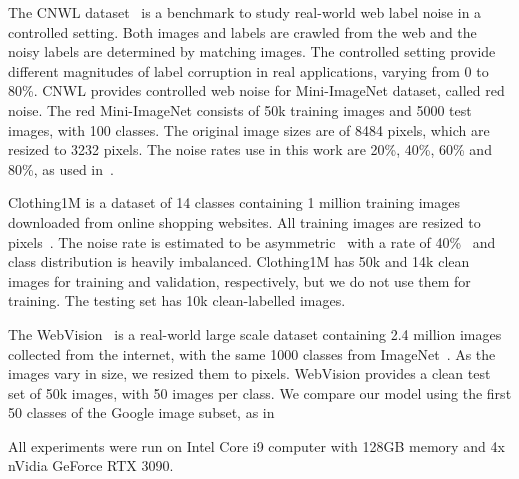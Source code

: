 \documentclass[review]{elsarticle}
\theoremstyle{plain}
\begin{document}
The CNWL dataset~\citep{jiang2020beyond} is a benchmark to study real-world web label noise in a controlled setting. Both images and labels are crawled from the web and the noisy labels are determined by matching images. The controlled setting provide different magnitudes of label corruption in real applications, varying from 0 to 80\%. CNWL provides controlled web noise for Mini-ImageNet dataset, called red noise. The red Mini-ImageNet consists of 50k training images and 5000 test images, with 100 classes. The original image sizes are of 8484 pixels, which are resized to 3232 pixels. The noise rates use in this work are 20\%, 40\%, 60\% and 80\%, as used in~\citep{FaMUS}.   

Clothing1M is a dataset of 14 classes containing 1 million training images downloaded from online shopping websites.
All training images are resized to  pixels~\citep{li2020dividemix, han2019deep}. 
The noise rate is estimated to be asymmetric~\citep{yi2019probabilistic} with a rate of 40\%~\citep{xiao2015learning} and class distribution is heavily imbalanced.
Clothing1M has 50k and 14k clean images for 
training and validation, respectively, but we do not use them for training. 
The testing set has 10k clean-labelled images.

The WebVision~\citep{li2017webvision} is a real-world large scale dataset containing 2.4 million images collected from the  internet,  with  the  same 1000 classes from ImageNet~\citep{deng2009imagenet}. As the images vary in size, we resized them to   pixels. WebVision provides a clean test set of 50k images, with 50 images per class.  We compare our model using the first 50 classes of the Google image subset, as in \citep{li2020dividemix, chen2019understanding}

All experiments were run on Intel Core i9 computer with 128GB memory and 4x nVidia GeForce RTX 3090.


\begin{table}
\centering
{}
\caption{Test accuracy (\%) for Red Mini-ImageNet. Results from baseline methods are as presented in \citep{FaMUS}. Top methods within  are in \textbf{bold}.}
\label{tab:results_red_noise}
\end{table}
\end{document}
